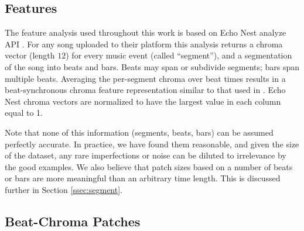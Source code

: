 \documentclass{article}
\newcommand{\eg}{e.g.~}
\begin{document}
\subsection{Features}
The feature analysis used throughout this work is based on Echo Nest
analyze API \cite{EchoNest}.  
%
For any song uploaded to their platform this analysis returns a chroma
vector (length $12$) for every music event (called ``segment''), and a
segmentation of the song into beats and bars. Beats may span or 
subdivide segments; bars span multiple beats.
%
Averaging the per-segment chroma over beat times results in a
beat-synchronous chroma feature representation similar to that used in
\cite{Ellis2007a_small}.  Echo Nest chroma vectors are normalized to have the 
largest value in each column equal to 1.


Note that none of this information (segments, beats, bars)
can be assumed perfectly accurate.
In practice, we have found them reasonable, 
and given the size of the dataset, any rare imperfections or noise
can be diluted to irrelevance by the good examples.  
We also believe that patch sizes based on a number of beats or bars are more
meaningful than an arbitrary time length. This is discussed further in 
Section \ref{ssec:segment}.


\subsection{Beat-Chroma Patches} \label{ssec:beatpatch}
\end{document}

